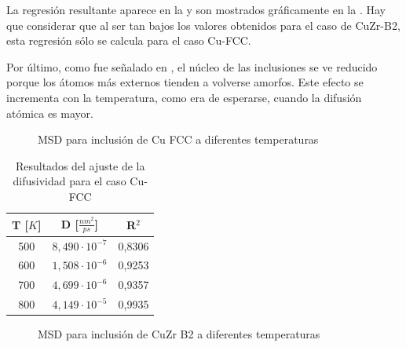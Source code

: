 La regresión resultante aparece en la  y son mostrados gráficamente en la . Hay que considerar que al ser tan bajos los valores obtenidos para el caso de CuZr-B2, esta regresión sólo se calcula para el caso Cu-FCC.


Por último, como fue señalado en \cite{albe13}, el núcleo de las inclusiones se ve reducido porque los átomos más externos tienden a volverse amorfos. Este efecto se incrementa con la temperatura, como era de esperarse, cuando la difusión atómica es mayor.

\begin{figure}[htp]
\centering
{}

\caption[MSD para inclusión de Cu FCC a diferentes temperaturas]{MSD para inclusión de Cu FCC a diferentes temperaturas}
\label{C4:fg:msd_Cu_FCC}
\end{figure}

\begin{table}[htp]
\begin{center}
\begin{tabular}{*{3}{c}}
\hline
T [$K$] & D [$\frac{nm^{2}}{ps}$] & R$^{2}$ \\
\hline \hline
500 & $8,490\cdot 10^{-7}$ & 0,8306 \\
\hline
600 & $1,508\cdot 10^{-6}$ & 0,9253 \\
\hline
700 & $4,699\cdot 10^{-6}$ & 0,9357 \\
\hline
800 & $4,149\cdot 10^{-5}$ & 0,9935 \\
\hline
\end{tabular}
\end{center}
\caption{Resultados del ajuste de la difusividad para el caso Cu-FCC}
\label{C4:tb:FCC_Diff_Fit_Restults}
\end{table}

\begin{figure}[htp]
\centering
{}

\caption[MSD para inclusión de CuZr B2 a diferentes temperaturas]{MSD para inclusión de CuZr B2 a diferentes temperaturas}
\label{C4:fg:msd_CuZr_B2}
\end{figure}


